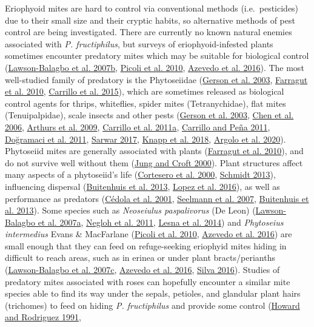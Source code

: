 \documentclass[12pt,final,CPage]{ufthesis}
\begin{document}
{  Eriophyoid mites are hard to control via conventional methods (i.e.~pesticides) due to their small size and their cryptic habits, so alternative methods of pest control are being investigated. There are currently no known natural enemies associated with \emph{P. fructiphilus}, but surveys of eriophyoid-infested plants sometimes encounter predatory mites which may be suitable for biological control (\protect\hyperlink{ref-LawsonBalagbo2007b}{Lawson-Balagbo et al. 2007b}, \protect\hyperlink{ref-Picoli2010}{Picoli et al. 2010}, \protect\hyperlink{ref-Azevedo2016}{Azevedo et al. 2016}). The most well-studied family of predatory is the Phytoseiidae (\protect\hyperlink{ref-Gerson2003}{Gerson et al. 2003}, \protect\hyperlink{ref-Farragut2010}{Farragut et al. 2010}, \protect\hyperlink{ref-Carrillo2015}{Carrillo et al. 2015}), which are sometimes released as biological control agents for thrips, whiteflies, spider mites (Tetranychidae), flat mites (Tenuipalpidae), scale insects and other pests (\protect\hyperlink{ref-Gerson2003}{Gerson et al. 2003}, \protect\hyperlink{ref-Chen2006}{Chen et al. 2006}, \protect\hyperlink{ref-Arthurs2009}{Arthurs et al. 2009}, \protect\hyperlink{ref-Carrillo2011a}{Carrillo et al. 2011a}, \protect\hyperlink{ref-Carrillo2011}{Carrillo and Peña 2011}, \protect\hyperlink{ref-Dogramaci2011}{Doğramaci et al. 2011}, \protect\hyperlink{ref-Sarwar2017}{Sarwar 2017}, \protect\hyperlink{ref-Knapp2018}{Knapp et al. 2018}, \protect\hyperlink{ref-Argolo2020}{Argolo et al. 2020}). Phytoseiid mites are generally associated with plants (\protect\hyperlink{ref-Farragut2010}{Farragut et al. 2010}), and do not survive well without them (\protect\hyperlink{ref-Jung2000}{Jung and Croft 2000}). Plant structures affect many aspects of a phytoseiid's life (\protect\hyperlink{ref-Cortesero2000}{Cortesero et al. 2000}, \protect\hyperlink{ref-Schmidt2013}{Schmidt 2013}), influencing dispersal (\protect\hyperlink{ref-Buitenhuis2013}{Buitenhuis et al. 2013}, \protect\hyperlink{ref-Lopez2016}{Lopez et al. 2016}), as well as performance as predators (\protect\hyperlink{ref-Cedola2001}{Cédola et al. 2001}, \protect\hyperlink{ref-Seelmann2007}{Seelmann et al. 2007}, \protect\hyperlink{ref-Buitenhuis2013}{Buitenhuis et al. 2013}). Some species such as \emph{Neoseiulus paspalivorus} (De Leon) (\protect\hyperlink{ref-LawsonBalagbo2007}{Lawson-Balagbo et al. 2007a}, \protect\hyperlink{ref-Negloh2011}{Negloh et al. 2011}, \protect\hyperlink{ref-Lesna2014}{Lesna et al. 2014}) and \emph{Phytoseius intermedius} Evans \& MacFarlane (\protect\hyperlink{ref-Picoli2010}{Picoli et al. 2010}, \protect\hyperlink{ref-Azevedo2016}{Azevedo et al. 2016}) are small enough that they can feed on refuge-seeking eriophyid mites hiding in difficult to reach areas, such as in erinea or under plant bracts/perianths (\protect\hyperlink{ref-LawsonBalagbo2007a}{Lawson-Balagbo et al. 2007c}, \protect\hyperlink{ref-Azevedo2016}{Azevedo et al. 2016}, \protect\hyperlink{ref-Silva2016}{Silva 2016}). Studies of predatory mites associated with roses can hopefully encounter a similar mite species able to find its way under the sepals, petioles, and glandular plant hairs (trichomes) to feed on hiding \emph{P. fructiphilus} and provide some control (\protect\hyperlink{ref-Howard1991}{Howard and Rodriguez 1991}, }
\end{document}
